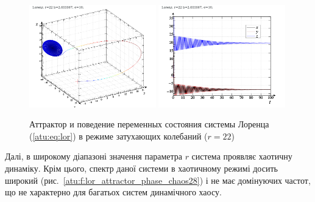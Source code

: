 \begin{figure}[ht!]
\begin{center}
  \includegraphics[width=0.49\textwidth]{p/cha/lor/lor0-p_xyz_r=022.png}
  \hfill
  \includegraphics[width=0.49\textwidth]{p/cha/lor/lor0-p_t_r=022.png}
\end{center}
  \caption{Аттрактор и поведение переменных состояния системы Лоренца (\ref{atu:eq:lor}) в режиме затухающих колебаний ($r=22$)}
\label{atu:f:lor_attractor_fading}
\end{figure}

Далі, в широкому діапазоні значення параметра $r$ система проявляє хаотичну
динаміку. Крім цього, спектр даної системи в хаотичному режимі досить широкий
(рис.~\ref{atu:f:lor_attractor_phase_chaos28}) і не має домінуючих
частот, що не характерно для багатьох систем динамічного хаосу.

